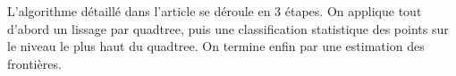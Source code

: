 L'algorithme détaillé dans l'article se déroule en 3 étapes. On applique tout d'abord un lissage par quadtree, puis une classification statistique des points sur le niveau le plus haut du quadtree. On termine enfin par une estimation des frontières.
